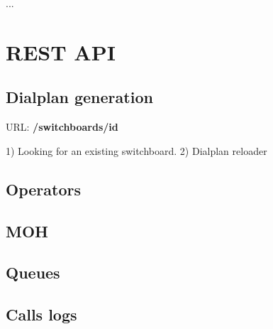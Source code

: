 ...


\section{REST API}
	
\subsection{Dialplan generation}
URL: \textbf{/switchboards/{id}}

1) Looking for an existing switchboard.
2) Dialplan reloader


\subsection{Operators}

\subsection{MOH}

\subsection{Queues}

\subsection{Calls logs}




